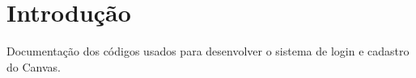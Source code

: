 \hypertarget{index_intro_sec}{}\section{Introdução}\label{index_intro_sec}
Documentação dos códigos usados para desenvolver o sistema de login e cadastro do Canvas. 